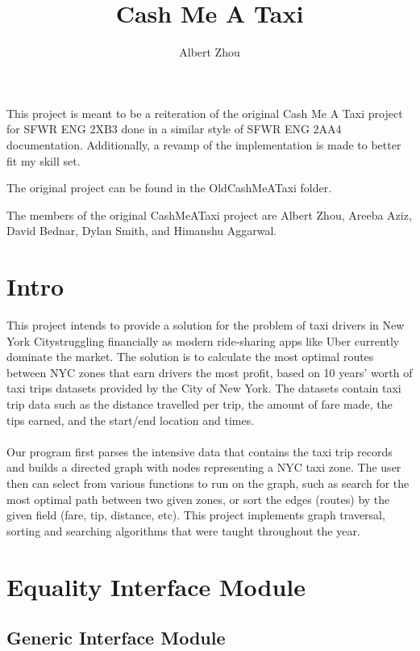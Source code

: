 \documentclass[12pt]{article}
\title{Cash Me A Taxi}
\author{Albert Zhou}
\begin{document}
\maketitle

This project is meant to be a reiteration of the original Cash Me A Taxi project for SFWR ENG 2XB3 done in a similar style of SFWR ENG 2AA4 documentation. Additionally, a revamp of the implementation is made to better fit my skill set.

The original project can be found in the OldCashMeATaxi folder.

The members of the original CashMeATaxi project are Albert Zhou, Areeba Aziz, David Bednar, Dylan Smith, and Himanshu Aggarwal.


\newpage

\tableofcontents

\newpage

\section{Intro}

This project intends to provide a solution for the problem of taxi drivers in New York Citystruggling financially as modern ride-sharing apps like Uber currently dominate the market. The solution is to calculate the most optimal routes between NYC zones that earn drivers the most profit, based on 10 years’ worth of taxi trips datasets provided by the City of New York. The datasets contain taxi trip data such as the distance travelled per trip, the amount of fare made, the tips earned, and the start/end location and times. \\ \\
Our program first parses the intensive data that contains the taxi trip records and builds a directed graph with nodes representing a NYC taxi zone. The user then can select from various functions to run on the graph, such as search for the most optimal path between two given zones, or sort the edges (routes) by the given field (fare, tip, distance, etc). This project implements graph traversal, sorting and searching algorithms that were taught throughout the year.

\newpage

\section* {Equality Interface Module}

\subsection*{Generic Interface Module}
\end{document}
